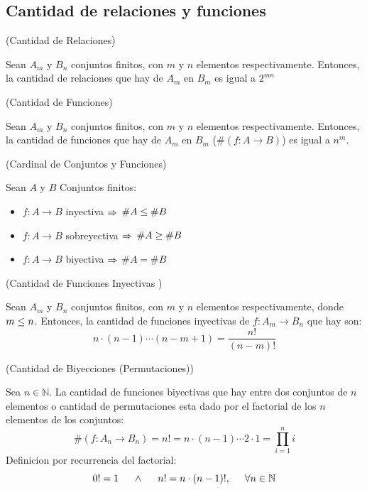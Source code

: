 \documentclass[10pt]{article}
\begin{document}
\begin{center}
\subsection{Cantidad de relaciones y funciones} 
\end{center}

\begin{prop}(Cantidad de Relaciones)

Sean $A_m$ y $B_n$ conjuntos finitos, con $m$ y $n$ elementos respectivamente. Entonces, la cantidad de relaciones que hay de $A_m$ en $B_m$ es igual a $2^{mn}$
\end{prop}

\begin{prop}(Cantidad de Funciones)

Sean $A_m$ y $B_n$ conjuntos finitos, con $m$ y $n$ elementos respectivamente. Entonces, la cantidad de funciones que hay de $A_m$ en $B_m$ ($\# (f: A \rightarrow B)$) es igual a $n^m$.
\end{prop}

\begin{prop}(Cardinal de Conjuntos y Funciones)

Sean $A$ y $B$ Conjuntos finitos:
\begin{itemize}
	\item $f: A \rightarrow B$ inyectiva $\Rightarrow$ $\# A \leq \# B$
	\item $f: A \rightarrow B$ sobreyectiva $\Rightarrow$ $\# A \geq \# B$
	\item $f: A \rightarrow B$ biyectiva $\Rightarrow$ $\# A = \# B$
\end{itemize}
\end{prop}


\begin{defi}(Cantidad de Funciones Inyectivas )

Sean $A_m$ y $B_n$ conjuntos finitos, con $m$ y $n$ elementos respectivamente, donde $m \leq n$. Entonces, la cantidad de funciones inyectivas de $f: A_m \rightarrow B_n$ que hay son:
\[n \cdot (n-1) \cdots (n-m+1) = \frac{n!}{(n-m)!}\]
\end{defi}

\begin{defi}(Cantidad de Biyecciones (Permutaciones))

Sea $n \in \mathbb{N}$. La cantidad de funciones biyectivas que hay entre dos conjuntos de $n$ elementos o cantidad de permutaciones esta dado por el factorial de los $n$ elementos de los conjuntos:
\[\#(f: A_n \rightarrow B_n) = n! = n \cdot (n-1) \cdots 2 \cdot 1 = \prod_{i=1}^n i\]
Definicion por recurrencia del factorial:
\[0!=1 \hspace{0.5cm} \land \hspace{0.5cm} n! = n \cdot (n-1)! ,\hspace{0.5cm} \forall n \in \mathbb{N}\]
\end{defi}
\end{document}

